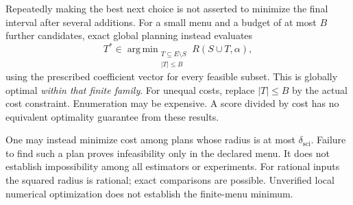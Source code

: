 \documentclass[11pt]{article}
\theoremstyle{remark}
\newcommand{\sci}{\delta_{\mathrm{sci}}}
\DeclareMathOperator*{\argmin}{arg\,min}
\begin{document}
Repeatedly making the best next choice is not asserted to minimize the final interval after several additions. For a small menu and a budget of at most $B$ further candidates, exact global planning instead evaluates
\begin{equation}
 T^*\in\argmin_{\substack{T\subseteq E\setminus S\\|T|\le B}}
                  R(S\cup T,\alpha),                         \label{eq:global}
\end{equation}
using the prescribed coefficient vector for every feasible subset. This is globally optimal \emph{within that finite family}. For unequal costs, replace $|T|\le B$ by the actual cost constraint. Enumeration may be expensive. A score divided by cost has no equivalent optimality guarantee from these results.

One may instead minimize cost among plans whose radius is at most $\sci$. Failure to find such a plan proves infeasibility only in the declared menu. It does not establish impossibility among all estimators or experiments. For rational inputs the squared radius is rational; exact comparisons are possible. Unverified local numerical optimization does not establish the finite-menu minimum.
\end{document}
